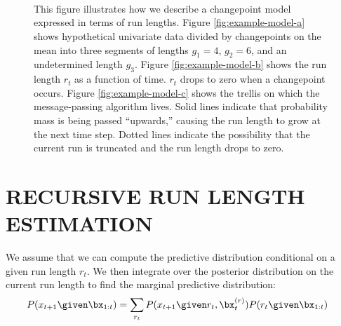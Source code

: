 \documentclass[]{article}
\begin{document}
    \begin{figure}[!t]
      \centering 
      \\
      \\
      \\
      \caption{This figure illustrates how we describe a changepoint model
      expressed in terms of run lengths.  Figure \ref{fig:example-model-a}
      shows hypothetical univariate data divided by changepoints on the
      mean into three segments of lengths $g_{1}=4$, $g_{2}=6$, and an
      undetermined length $g_{3}$.  Figure \ref{fig:example-model-b} shows
      the run length $r_{t}$ as a function of time. $r_{t}$ drops to zero
      when a changepoint occurs.  Figure \ref{fig:example-model-c} shows
      the trellis on which the message-passing algorithm lives.  Solid
      lines indicate that probability mass is being passed ``upwards,''
      causing the run length to grow at the next time step.  Dotted lines
      indicate the possibility that the current run is truncated and the
      run length drops to zero.}
      \label{fig:example-model}
    \end{figure}

  \section{RECURSIVE RUN LENGTH ESTIMATION}
    We assume that we can compute the predictive distribution conditional
    on a given run length $r_{t}$.  We then integrate over the posterior
    distribution on the current run length to find the marginal predictive
    distribution:
    \begin{align}\label{eqn:predictive}
      P(x_{t+1} \given \bx_{1:t}) &=
      \sum_{r_{t}} P(x_{t+1} \given r_{t}, \bx_{t}^{(r)})
                   P(r_{t} \given \bx_{1:t})
    \end{align}
\end{document}
